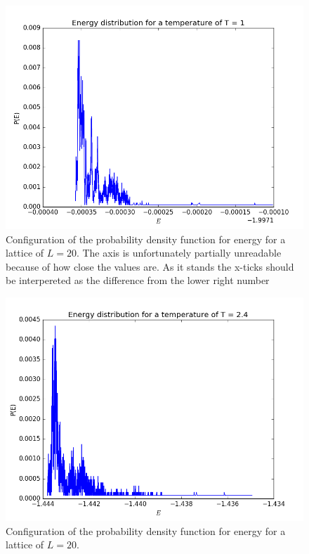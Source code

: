 \documentclass[12pt]{article}
\begin{document}
\begin{figure}[H]
\includegraphics[scale=0.6]{PDF_T_1.png}
\caption{Configuration of the probability density function for energy for a lattice of $L = 20$. The axis is unfortunately partially unreadable because of how close the values are. As it stands the x-ticks should be interpereted as the difference from the lower right number}\label{fig:pdf_1}
\end{figure}

\begin{figure}[H]
\includegraphics[scale=0.6]{PDF_T_24.png}
\caption{Configuration of the probability density function for energy for a lattice of $L = 20$. }\label{fig:pdf_24}
\end{figure}
\end{document}
